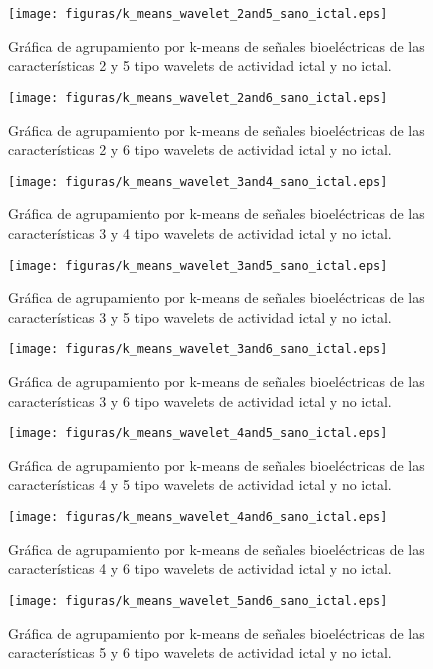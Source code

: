 \begin{figure}[H]
    \centering
    \texttt{[image: figuras/k\_means\_wavelet\_2and5\_sano\_ictal.eps]}
    \caption{Gráfica de agrupamiento por k-means de señales bioeléctricas de las características 2 y 5 tipo wavelets de actividad ictal y no ictal.}
    \label{fig: k_means_wave_2_5}
\end{figure}
\begin{figure}[H]
    \centering
    \texttt{[image: figuras/k\_means\_wavelet\_2and6\_sano\_ictal.eps]}
    \caption{Gráfica de agrupamiento por k-means de señales bioeléctricas de las características 2 y 6 tipo wavelets de actividad ictal y no ictal.}
    \label{fig: k_means_wave_2_6}
\end{figure}
\begin{figure}[H]
    \centering
    \texttt{[image: figuras/k\_means\_wavelet\_3and4\_sano\_ictal.eps]}
    \caption{Gráfica de agrupamiento por k-means de señales bioeléctricas de las características 3 y 4 tipo wavelets de actividad ictal y no ictal.}
    \label{fig: k_means_wave_3_4}
\end{figure}
\begin{figure}[H]
    \centering
    \texttt{[image: figuras/k\_means\_wavelet\_3and5\_sano\_ictal.eps]}
    \caption{Gráfica de agrupamiento por k-means de señales bioeléctricas de las características 3 y 5 tipo wavelets de actividad ictal y no ictal.}
    \label{fig: k_means_wave_3_5}
\end{figure}
\begin{figure}[H]
    \centering
    \texttt{[image: figuras/k\_means\_wavelet\_3and6\_sano\_ictal.eps]}
    \caption{Gráfica de agrupamiento por k-means de señales bioeléctricas de las características 3 y 6 tipo wavelets de actividad ictal y no ictal.}
    \label{fig: k_means_wave_3_6}
\end{figure}
\begin{figure}[H]
    \centering
    \texttt{[image: figuras/k\_means\_wavelet\_4and5\_sano\_ictal.eps]}
    \caption{Gráfica de agrupamiento por k-means de señales bioeléctricas de las características 4 y 5 tipo wavelets de actividad ictal y no ictal.}
    \label{fig: k_means_wave_4_5}
\end{figure}
\begin{figure}[H]
    \centering
    \texttt{[image: figuras/k\_means\_wavelet\_4and6\_sano\_ictal.eps]}
    \caption{Gráfica de agrupamiento por k-means de señales bioeléctricas de las características 4 y 6 tipo wavelets de actividad ictal y no ictal.}
    \label{fig: k_means_wave_4_6}
\end{figure}
\begin{figure}[H]
    \centering
    \texttt{[image: figuras/k\_means\_wavelet\_5and6\_sano\_ictal.eps]}
    \caption{Gráfica de agrupamiento por k-means de señales bioeléctricas de las características 5 y 6 tipo wavelets de actividad ictal y no ictal.}
    \label{fig: k_means_wave_5_6}
\end{figure}

